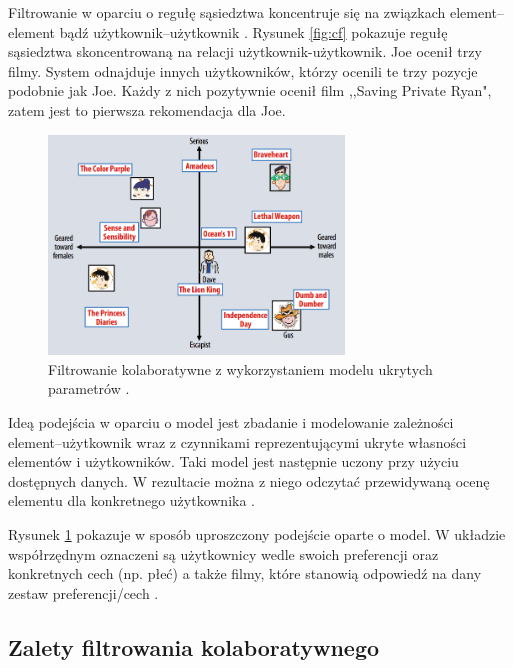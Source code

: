 \documentclass[twoside]{iisthesis}
\begin{document}
	  Filtrowanie w oparciu o regułę sąsiedztwa koncentruje się na związkach element--element bądź użytkownik--użytkownik \cite{id:AdvancesInCollaborativeFiltering}.
	  Rysunek \ref{fig:cf} pokazuje regułę sąsiedztwa skoncentrowaną na relacji użytkownik-użytkownik. Joe ocenił trzy filmy. System odnajduje innych użytkowników, którzy ocenili te trzy pozycje podobnie jak Joe. Każdy z nich pozytywnie ocenił film ,,Saving Private Ryan", zatem jest to pierwsza rekomendacja dla Joe. 
	  
	  \begin{figure}[!ht] 
	  	\centering
	  	\includegraphics[width=0.7\textwidth]{cf2}
	  	\caption{Filtrowanie kolaboratywne z wykorzystaniem modelu ukrytych parametrów \protect\cite{koren2009matrix}.}
	  	\label{fig:cf2}
	  \end{figure}
	  
	  Ideą podejścia w oparciu o model jest zbadanie i modelowanie zależności element--użytkownik wraz z czynnikami reprezentującymi ukryte własności elementów i użytkowników. Taki model jest następnie uczony przy użyciu dostępnych danych. W rezultacie można z niego odczytać przewidywaną ocenę elementu dla konkretnego użytkownika \cite{id:ComprehensiveSurveyOfNeighborhoodBasedRecommendationMethods, id:AdvancesInCollaborativeFiltering}.
	  
	  Rysunek \ref{fig:cf2} pokazuje w sposób uproszczony podejście oparte o model. W układzie współrzędnym oznaczeni są użytkownicy wedle swoich preferencji oraz konkretnych cech (np. płeć) a także filmy, które stanowią odpowiedź na dany zestaw preferencji/cech \cite{koren2009matrix}. 
	  
	  \subsection{Zalety filtrowania kolaboratywnego}
	  
\end{document}
